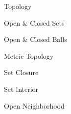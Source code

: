 \begin{definition}{Topology}
    
\end{definition}

\begin{definition}{Open \& Closed Sets}
    
\end{definition}

\begin{definition}{Open \& Closed Balls}
    
\end{definition}

\begin{definition}{Metric Topology}
    
\end{definition}

\begin{definition}{Set Closure}
    
\end{definition}

\begin{definition}{Set Interior}
    
\end{definition}

\begin{definition}{Open Neighborhood}
    
\end{definition}